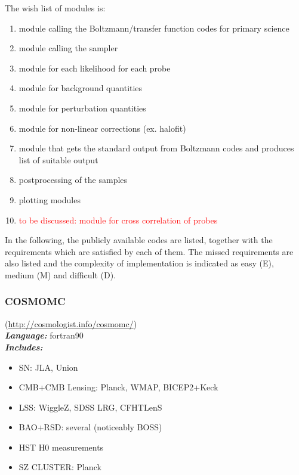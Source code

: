 The wish list of modules is:
\begin{enumerate}
 \item module calling the Boltzmann/transfer function codes for primary science
 \item module calling the sampler
 \item module for each likelihood for each probe
 \item module for background quantities
 \item module for perturbation quantities
 \item module for non-linear corrections (ex. halofit)
 \item module that gets the standard output from Boltzmann codes and produces list of suitable output
 \item postprocessing of the samples
 \item plotting modules 
 \item \textcolor{red}{to be discussed: module for cross correlation of probes}
\end{enumerate}

In the following, the publicly available codes are listed, together with the requirements which are satisfied by each of them. The missed requirements are also listed and the complexity 
of implementation is indicated as easy (E), medium (M) and difficult (D).

\newpage
\subsubsection{COSMOMC}
(\url{http://cosmologist.info/cosmomc/})\\

{\it \bf Language:} fortran90\\

{\it \bf Includes:}\\
\begin{itemize}
\item SN: JLA, Union
\item CMB+CMB Lensing: Planck, WMAP, BICEP2+Keck
\item LSS: WiggleZ, SDSS LRG, CFHTLenS
\item BAO+RSD: several (noticeably BOSS)
\item HST H0 measurements
\item SZ CLUSTER: Planck
\end{itemize}


